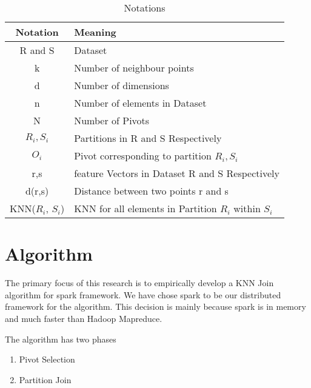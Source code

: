 \documentclass[conference]{IEEEtran}
\begin{document}
\begin{table}[!t]
  \caption{Notations}
  \label{notations}
  \centering
  \begin{tabular}{|c|l|}
    \hline
    Notation & Meaning \\
    \hline
    R and S & Dataset\\

    k & Number of neighbour points \\

    d & Number of dimensions \\

    n & Number of elements in Dataset \\

    N & Number of Pivots \\

    $R_i, S_i$ & Partitions in R and S Respectively \\

    $O_i$ & Pivot corresponding to partition $R_i, S_i$ \\

    r,s & feature Vectors in Dataset R and S Respectively \\

    d(r,s) & Distance between two points r and s \\

    KNN($R_i$, $S_i$) & KNN for all elements in Partition $R_i$ within
                        $S_i$ \\
    \hline
  \end{tabular}
\end{table}


\bigskip

\section{Algorithm}
The primary focus of this research is to empirically develop a KNN
Join algorithm for spark framework. We have chose spark to be our
distributed framework for the algorithm. This decision is mainly
because spark is in memory and much faster than Hadoop Mapreduce.

\bigskip

The algorithm has two phases
\begin{enumerate}
\item Pivot Selection
\item Partition Join
\end{enumerate}
\end{document}
